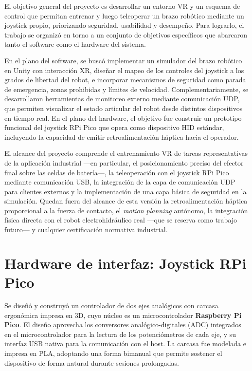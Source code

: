 \documentclass[12pt]{article}
\begin{document}
El objetivo general del proyecto es desarrollar un entorno VR y un esquema de control que permitan entrenar y luego teleoperar un brazo robótico mediante un joystick propio, priorizando seguridad, usabilidad y desempeño. Para lograrlo, el trabajo se organizó en torno a un conjunto de objetivos específicos que abarcaron tanto el software como el hardware del sistema.

En el plano del software, se buscó implementar un simulador del brazo robótico en Unity con interacción XR, diseñar el mapeo de los controles del joystick a los grados de libertad del robot, e incorporar mecanismos de seguridad como parada de emergencia, zonas prohibidas y límites de velocidad. Complementariamente, se desarrollaron herramientas de monitoreo externo mediante comunicación UDP, que permiten visualizar el estado articular del robot desde distintos dispositivos en tiempo real. En el plano del hardware, el objetivo fue construir un prototipo funcional del joystick RPi Pico que opera como dispositivo HID estándar, incluyendo la capacidad de emitir retroalimentación háptica hacia el operador.

El alcance del proyecto comprende el entrenamiento VR de tareas representativas de la aplicación industrial ---en particular, el posicionamiento preciso del efector final sobre las celdas de batería---, la teleoperación con el joystick RPi Pico mediante comunicación USB, la integración de la capa de comunicación UDP para clientes externos y la implementación de una capa básica de seguridad en la simulación. Quedan fuera del alcance de esta versión la retroalimentación háptica proporcional a la fuerza de contacto, el \textit{motion planning} autónomo, la integración física directa con el robot electrohidráulico real ---que se reserva como trabajo futuro--- y cualquier certificación normativa industrial.


\section{Hardware de interfaz: Joystick RPi Pico}

Se diseñó y construyó un controlador de dos ejes analógicos con carcasa ergonómica impresa en 3D, cuyo núcleo es un microcontrolador \textbf{Raspberry Pi Pico}. El diseño aprovecha los conversores analógico-digitales (ADC) integrados en el microcontrolador para la lectura de los potenciómetros de cada eje, y su interfaz USB nativa para la comunicación con el host. La carcasa fue modelada e impresa en PLA, adoptando una forma bimanual que permite sostener el dispositivo de forma natural durante sesiones prolongadas.
\end{document}
